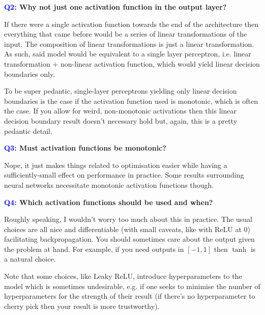\documentclass[11pt]{article}
\begin{document}
\begin{center}
    \textbf{\textcolor{blue}{Q2:} Why not just one activation function in the output layer?}
\end{center}
If there were a single activation function towards the end of the architecture then everything that came before would be a series of linear transformations of the input. The composition of linear transformations is just a linear transformation. As such, said model would be equivalent to a single layer perceptron, i.e. linear transformation + non-linear activation function, which would yield linear decision boundaries only.

To be super pedantic, single-layer perceptrons yielding only linear decision boundaries is the case if the activation function used is monotonic, which is often the case. If you allow for weird, non-monotonic activations then this linear decision boundary result doesn't necessary hold but, again, this is a pretty pedantic detail.

\begin{center}
    \textbf{\textcolor{blue}{Q3:} Must activation functions be monotonic?}
\end{center}
Nope, it just makes things related to optimisation easier while having a sufficiently-small effect on performance in practice. Some results surrounding neural networks necessitate monotonic activation functions though.

\begin{center}
    \textbf{\textcolor{blue}{Q4:} Which activation functions should be used and when?}
\end{center}
Roughly speaking, I wouldn't worry too much about this in practice. The usual choices are all nice and differentiable (with small caveats, like with ReLU at 0) facilitating backpropagation. You should sometimes care about the output given the problem at hand. For example, if you need outputs in $[-1,1]$ then $\tanh$ is a natural choice.

Note that some choices, like Leaky ReLU, introduce hyperparameters to the model which is sometimes undesirable, e.g. if one seeks to minimise the number of hyperparameters for the strength of their result (if there's no hyperparameter to cherry pick then your result is more trustworthy).
\end{document}
